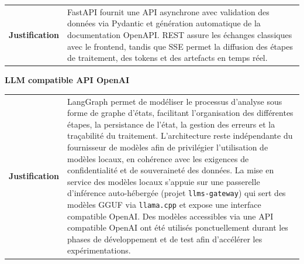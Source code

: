 \noindent
\begin{tabularx}{\textwidth}{@{}p{}X@{}}
\textcolor{MidGray}{\textbf{Justification}} &
FastAPI fournit une API asynchrone avec validation des données
via Pydantic et génération automatique de la documentation OpenAPI.
REST assure les échanges classiques avec le frontend, tandis que
SSE permet la diffusion des étapes de traitement, des tokens et
des artefacts en temps réel.
\end{tabularx}

\techseparator


\vspace{0.15cm}

\noindent
{}
\hspace{0.8cm}
{\bfseries\color{DarkSlate}LLM compatible API OpenAI}

\vspace{0.15cm}

\noindent
\begin{tabularx}{\textwidth}{@{}p{}X@{}}
\textcolor{MidGray}{\textbf{Justification}} &
LangGraph permet de modéliser le processus d'analyse sous forme de
graphe d'états, facilitant l'organisation des différentes étapes,
la persistance de l'état, la gestion des erreurs et la traçabilité
du traitement. L'architecture reste indépendante du fournisseur de
modèles afin de privilégier l'utilisation de modèles locaux, en
cohérence avec les exigences de confidentialité et de souveraineté
des données. La mise en service des modèles locaux s'appuie sur une
passerelle d'inférence auto-hébergée (projet \texttt{llms-gateway}) qui
sert des modèles GGUF via \texttt{llama.cpp} et expose une interface
compatible OpenAI. Des modèles accessibles via une API compatible OpenAI
ont été utilisés ponctuellement durant les phases de développement
et de test afin d'accélérer les expérimentations.
\end{tabularx}

\techseparator



